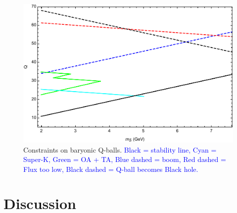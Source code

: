 \documentclass[twocolumn,showpacs,preprintnumbers,amsmath,amssymb,prd]{revtex4}
\begin{document}
\begin{figure}
\includegraphics[scale=.45]{Qballconstraint.pdf}
\caption{Constraints on baryonic Q-balls. \textcolor{blue}{Black = stability line, Cyan = Super-K, Green = OA + TA, Blue dashed = boom, Red dashed = Flux too low, Black dashed = Q-ball becomes Black hole.}}
\label{fig:Qballconstraint}
\end{figure}

\section{Discussion}
\label{sec:discussion}
\end{document}
